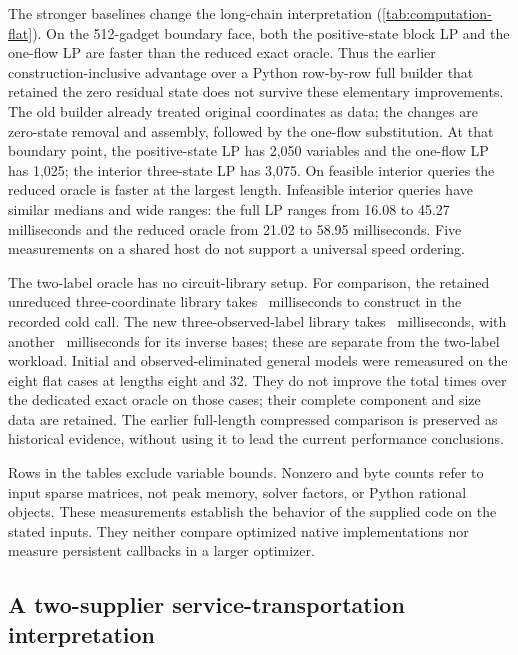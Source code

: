 

The stronger baselines change the long-chain interpretation
(\cref{tab:computation-flat}). On the 512-gadget boundary face, both
the positive-state block LP and the one-flow LP are faster than the reduced
exact oracle. Thus the earlier construction-inclusive advantage over a
Python row-by-row full builder that retained the zero residual state does
not survive these elementary improvements. The old builder already treated
original coordinates as data; the changes are zero-state removal and
assembly, followed by the one-flow substitution. At that boundary point,
the positive-state LP has 2,050 variables and the one-flow LP has 1,025;
the interior three-state LP has 3,075.
On feasible interior queries the reduced oracle is faster at the largest
length. Infeasible interior queries have similar medians and wide ranges:
the full LP ranges from 16.08 to 45.27 milliseconds and the reduced oracle
from 21.02 to 58.95 milliseconds. Five measurements on a shared host do
not support a universal speed ordering.

The two-label oracle has no circuit-library setup. For comparison, the
retained unreduced three-coordinate library takes \BenchOldCold\ milliseconds
to construct in the recorded cold call. The new three-observed-label library
takes \BenchNewThreeCold\ milliseconds, with another
\BenchNewThreeBases\ milliseconds for its inverse bases; these are separate
from the two-label workload. Initial and observed-eliminated general models
were remeasured on the eight flat cases at lengths eight and 32. They do not
improve the total times over the dedicated exact oracle on those cases;
their complete component and size data are retained. The earlier full-length
compressed comparison is preserved as historical evidence, without using it
to lead the current performance conclusions.

Rows in the tables exclude variable bounds. Nonzero and byte counts refer
to input sparse matrices, not peak memory, solver factors, or Python rational
objects. These measurements establish the behavior of the supplied code on
the stated inputs. They neither compare optimized native implementations
nor measure persistent callbacks in a larger optimizer.

\subsection{A two-supplier service-transportation interpretation}

